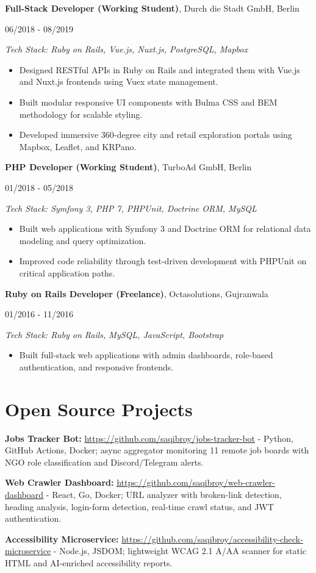 \documentclass[10pt,a4paper]{article}
\newcommand{\entry}[4]{%
  \Needspace{7\baselineskip}%
  \textbf{#1}, #2\par
  #3\par
  \textit{Tech Stack: #4}\par
}
\begin{document}
\entry{Full-Stack Developer (Working Student)}{Durch die Stadt GmbH, Berlin}{06/2018 - 08/2019}{Ruby on Rails, Vue.js, Nuxt.js, PostgreSQL, Mapbox}
\begin{itemize}
  \item Designed RESTful APIs in Ruby on Rails and integrated them with Vue.js and Nuxt.js frontends using Vuex state management.
  \item Built modular responsive UI components with Bulma CSS and BEM methodology for scalable styling.
  \item Developed immersive 360-degree city and retail exploration portals using Mapbox, Leaflet, and KRPano.
\end{itemize}

\entry{PHP Developer (Working Student)}{TurboAd GmbH, Berlin}{01/2018 - 05/2018}{Symfony 3, PHP 7, PHPUnit, Doctrine ORM, MySQL}
\begin{itemize}
  \item Built web applications with Symfony 3 and Doctrine ORM for relational data modeling and query optimization.
  \item Improved code reliability through test-driven development with PHPUnit on critical application paths.
\end{itemize}

\entry{Ruby on Rails Developer (Freelance)}{Octasolutions, Gujranwala}{01/2016 - 11/2016}{Ruby on Rails, MySQL, JavaScript, Bootstrap}
\begin{itemize}
  \item Built full-stack web applications with admin dashboards, role-based authentication, and responsive frontends.
\end{itemize}

\section*{Open Source Projects}
\textbf{Jobs Tracker Bot:} \url{https://github.com/saqibroy/jobs-tracker-bot} - Python, GitHub Actions, Docker; async aggregator monitoring 11 remote job boards with NGO role classification and Discord/Telegram alerts.\par
\textbf{Web Crawler Dashboard:} \url{https://github.com/saqibroy/web-crawler-dashboard} - React, Go, Docker; URL analyzer with broken-link detection, heading analysis, login-form detection, real-time crawl status, and JWT authentication.\par
\textbf{Accessibility Microservice:} \url{https://github.com/saqibroy/accessibility-check-microservice} - Node.js, JSDOM; lightweight WCAG 2.1 A/AA scanner for static HTML and AI-enriched accessibility reports.
\end{document}
